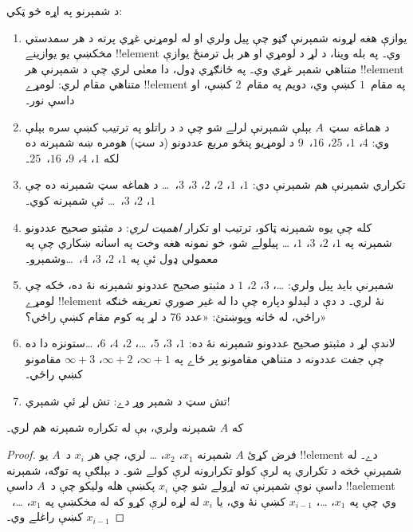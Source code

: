 \documentclass[../../../include/open-logic-section]{subfiles}
\begin{document}
\begin{explain}
د شمېرنو په اړه څو ټکي:
\begin{enumerate}
\item يوازې هغه لړونه شمېرنې ګڼو چې پيل ولري او له لومړني
  غړي پرته د هر  سمدستي
  مخکښې يو يوازينے !!{element} وي۔ په بله وينا، د لړ د لومړي
   او هر بل  ترمنځ
  يوازې متناهي شمېر غړي وي۔ په ځانګړي ډول، دا معنٰی لري چې
  د شمېرنې هر !!{element} متناهي مقام لري: لومړے !!{element}
  په مقام~$1$ کښې وي، دويم په مقام~$2$ کښې، او داسې نور۔
\item د هماغه سټ~$A$ بېلې شمېرنې لرلے شو چې د
   د راتلو په ترتيب کښې سره بېلې وي:
  $4$، $1$، $25$، $16$،~$9$ د لومړيو پنځو مربع عددونو (د سټ)
  هومره ښه شمېرنه ده لکه $1$، $4$، $9$، $16$،~$25$۔
\item تکراري شمېرنې هم شمېرنې دي: $1$، $1$، $2$، $2$، $3$،
  $3$،~\dots{} د هماغه سټ شمېرنه ده چې $1$، $2$، $3$،~\dots{}
  ئې شمېرنه کوي۔
\item کله چې يوه شمېرنه ټاکو، ترتيب او تکرار \emph{اهميت لري}:
  د مثبتو صحيح عددونو شمېرنه په $1$، $2$، $3$، $1$، \dots{}
  پيلولے شو، خو نمونه هغه وخت په اسانه ښکاري چې په معمولي
  ډول ئې په $1$، $2$، $3$، $4$،~\dots وشمېرو۔
\item شمېرنې بايد پيل ولري: \dots، $3$، $2$، $1$ د مثبتو صحيح
  عددونو شمېرنه نۀ ده، ځکه چې لومړے !!{element} نۀ لري۔ د دې
  د ليدلو دپاره چې دا له غير صوري تعريفه څنګه راځي، له ځانه
  وپوښتئ: «عدد 76 د لړ په کوم مقام کښې راځي؟»
\item لاندې لړ د مثبتو صحيح عددونو شمېرنه نۀ ده:
  $1$، $3$، $5$، \dots، $2$، $4$، $6$، \dots\@ ستونزه دا ده چې
  جفت عددونه د متناهي مقامونو پر ځاے په $\infty + 1$،
  $\infty + 2$، $\infty + 3$ مقامونو کښې راځي۔
\item تش سټ د شمېر وړ دے: تش لړ ئې شمېري!{}
\end{enumerate}
\end{explain}

\begin{prop}
  که $A$ شمېرنه ولري، بې له تکراره شمېرنه هم لري۔
\end{prop}

\begin{proof}
  فرض کړئ $A$ شمېرنه $x_1$، $x_2$، \dots{} لري، چې هر $x_i$
  د~$A$ يو !!{element} دے۔ له شمېرنې څخه د تکراري
   په لرې کولو تکرارونه لرې کولے شو۔ د
  بېلګې په توګه، شمېرنه داسې نوې شمېرنې ته اړولے شو چې $x_i$
  پکښې هله وليکو چې د~$A$ داسې !!a{element} وي چې په $x_1$،
  \dots، $x_{i-1}$ کښې نۀ وي، يا $x_i$ له لړه لرې کړو که له
  مخکښې په $x_1$، \dots،~$x_{i-1}$ کښې راغلے وي۔
\end{proof}
\end{document}
